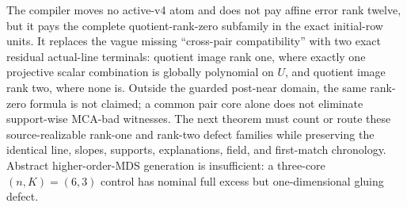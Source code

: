 \documentclass[11pt,a4paper]{amsart}
\numberwithin{equation}{section}
\theoremstyle{remark}
\begin{document}
\begin{remark}
\label{rem:mca-rank-twelve-gluing-target}
The compiler moves no active-v4 atom and does not pay affine error rank
twelve, but it pays the complete quotient-rank-zero subfamily in the exact
initial-row units.  It replaces the vague missing ``cross-pair
compatibility'' with two exact residual actual-line terminals: quotient
image rank one, where exactly one
projective scalar combination is globally polynomial on \(U\), and quotient
image rank two, where none is.  Outside the guarded post-near domain,
the same rank-zero formula is not claimed; a common pair core alone does not
eliminate support-wise MCA-bad witnesses.  The next theorem must count
or route these source-realizable rank-one and rank-two defect families while
preserving the identical line, slopes, supports, explanations, field, and
first-match chronology.  Abstract higher-order-MDS generation is
insufficient: a three-core \((n,K)=(6,3)\) control has nominal full excess
but one-dimensional gluing defect.
\end{remark}
\end{document}
